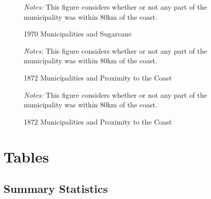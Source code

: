 \documentclass{article}
\begin{document}
\begin{figure}
  \caption{1970 Municipalities and Sugarcane}
  \begin{center}
  \textit{Notes:} This figure considers whether or not any part of the municipality was within 80km of the coast.
  \end{center}
  \label{fig:sugarcane_1970}
\end{figure}

\begin{figure}
  \caption{1872 Municipalities and Proximity to the Coast}
  \begin{center}
  \textit{Notes:} This figure considers whether or not any part of the municipality was within 80km of the coast.
  \end{center}
  \label{fig:cotton_1970}
\end{figure}

\begin{figure}
  \caption{1872 Municipalities and Proximity to the Coast}
  \begin{center}
  \textit{Notes:} This figure considers whether or not any part of the municipality was within 80km of the coast.
  \end{center}
  \label{fig:sugarcane_1970}
\end{figure}
\clearpage

\section*{Tables}

\subsection{Summary Statistics}


\end{document}
